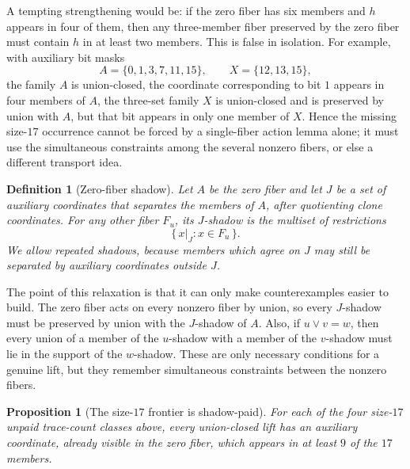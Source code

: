 \documentclass[11pt]{article}
\newtheorem{proposition}{Proposition}
\newtheorem{definition}{Definition}
\begin{document}
A tempting strengthening would be: if the zero fiber has six members and
$h$ appears in four of them, then any three-member fiber preserved by the
zero fiber must contain $h$ in at least two members.  This is false in
isolation.  For example, with auxiliary bit masks
\[
  A=\{0,1,3,7,11,15\},
  \qquad
  X=\{12,13,15\},
\]
the family $A$ is union-closed, the coordinate corresponding to bit $1$
appears in four members of $A$, the three-set family $X$ is union-closed and
is preserved by union with $A$, but that bit appears in only one member of
$X$.  Hence the missing size-$17$ occurrence cannot be forced by a
single-fiber action lemma alone; it must use the simultaneous constraints
among the several nonzero fibers, or else a different transport idea.

\begin{definition}[Zero-fiber shadow]
Let $A$ be the zero fiber and let $J$ be a set of auxiliary coordinates that
separates the members of $A$, after quotienting clone coordinates.  For any
other fiber $F_u$, its $J$-shadow is the multiset of restrictions
\[
  \{\,x|_J:x\in F_u\,\}.
\]
We allow repeated shadows, because members which agree on $J$ may still be
separated by auxiliary coordinates outside $J$.
\end{definition}

The point of this relaxation is that it can only make counterexamples easier
to build.  The zero fiber acts on every nonzero fiber by union, so every
$J$-shadow must be preserved by union with the $J$-shadow of $A$.  Also, if
$u\vee v=w$, then every union of a member of the $u$-shadow with a member of
the $v$-shadow must lie in the support of the $w$-shadow.  These are only
necessary conditions for a genuine lift, but they remember simultaneous
constraints between the nonzero fibers.

\begin{proposition}[The size-$17$ frontier is shadow-paid]
For each of the four size-$17$ unpaid trace-count classes above, every
union-closed lift has an auxiliary coordinate, already visible in the zero
fiber, which appears in at least $9$ of the $17$ members.
\end{proposition}
\end{document}

